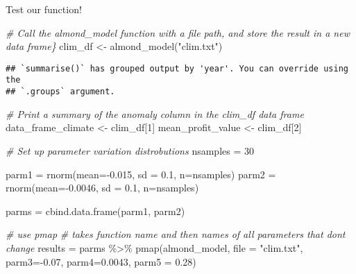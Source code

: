 \documentclass[
]{article}
\newenvironment{Shaded}{\begin{snugshade}}{\end{snugshade}}
\newcommand{\AttributeTok}[1]{\textcolor[rgb]{0.77,0.63,0.00}{#1}}
\newcommand{\CommentTok}[1]{\textcolor[rgb]{0.56,0.35,0.01}{\textit{#1}}}
\newcommand{\DecValTok}[1]{\textcolor[rgb]{0.00,0.00,0.81}{#1}}
\newcommand{\FloatTok}[1]{\textcolor[rgb]{0.00,0.00,0.81}{#1}}
\newcommand{\FunctionTok}[1]{\textcolor[rgb]{0.00,0.00,0.00}{#1}}
\newcommand{\NormalTok}[1]{#1}
\newcommand{\OtherTok}[1]{\textcolor[rgb]{0.56,0.35,0.01}{#1}}
\newcommand{\SpecialCharTok}[1]{\textcolor[rgb]{0.00,0.00,0.00}{#1}}
\newcommand{\StringTok}[1]{\textcolor[rgb]{0.31,0.60,0.02}{#1}}
\begin{document}
Test our function!

\begin{Shaded}
\begin{Highlighting}[]
\CommentTok{\# Call the almond\_model function with a file path, and store the result in a new data frame\}}
\NormalTok{clim\_df }\OtherTok{\textless{}{-}} \FunctionTok{almond\_model}\NormalTok{(}\StringTok{"clim.txt"}\NormalTok{)}
\end{Highlighting}
\end{Shaded}

\begin{verbatim}
## `summarise()` has grouped output by 'year'. You can override using the
## `.groups` argument.
\end{verbatim}

\begin{Shaded}
\begin{Highlighting}[]
\CommentTok{\# Print a summary of the anomaly column in the clim\_df data frame}
\NormalTok{data\_frame\_climate }\OtherTok{\textless{}{-}}\NormalTok{ clim\_df[}\DecValTok{1}\NormalTok{]}
\NormalTok{mean\_profit\_value }\OtherTok{\textless{}{-}}\NormalTok{ clim\_df[}\DecValTok{2}\NormalTok{]}
\end{Highlighting}
\end{Shaded}

\begin{Shaded}
\begin{Highlighting}[]
\CommentTok{\# Set up parameter variation distrobutions}
\NormalTok{nsamples }\OtherTok{=} \DecValTok{30}

\NormalTok{parm1 }\OtherTok{=} \FunctionTok{rnorm}\NormalTok{(}\AttributeTok{mean=}\SpecialCharTok{{-}}\FloatTok{0.015}\NormalTok{, }\AttributeTok{sd =} \FloatTok{0.1}\NormalTok{, }\AttributeTok{n=}\NormalTok{nsamples)}
\NormalTok{parm2 }\OtherTok{=} \FunctionTok{rnorm}\NormalTok{(}\AttributeTok{mean=}\SpecialCharTok{{-}}\FloatTok{0.0046}\NormalTok{, }\AttributeTok{sd =} \FloatTok{0.1}\NormalTok{, }\AttributeTok{n=}\NormalTok{nsamples)}

\NormalTok{parms }\OtherTok{=} \FunctionTok{cbind.data.frame}\NormalTok{(parm1, parm2)}

\CommentTok{\# use pmap }
\CommentTok{\# takes function name and then names of all parameters that don\textquotesingle{}t change}
\NormalTok{results }\OtherTok{=}\NormalTok{ parms }\SpecialCharTok{\%\textgreater{}\%} \FunctionTok{pmap}\NormalTok{(almond\_model,}
                         \AttributeTok{file =} \StringTok{"clim.txt"}\NormalTok{,}
                         \AttributeTok{parm3=}\SpecialCharTok{{-}}\FloatTok{0.07}\NormalTok{, }
                         \AttributeTok{parm4=}\FloatTok{0.0043}\NormalTok{, }
                         \AttributeTok{parm5 =} \FloatTok{0.28}\NormalTok{)}
\end{Highlighting}
\end{Shaded}
\end{document}
